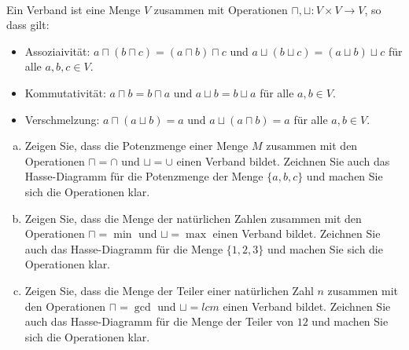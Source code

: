 \newcommand{\printpraesenzlsg}{false}
\newcommand{\printloesungen}{false}
\newcommand{\printbewertungen}{false}
\newcommand{\blattnummer}{2}



\iforiginal{}

	


\\
Ein Verband ist eine Menge $V$ zusammen mit Operationen $\sqcap, \sqcup:V\times V\to V$, so dass gilt:
\begin{itemize}
  \item Assoziaivität: $a \sqcap (b \sqcap c) = (a \sqcap b) \sqcap c$ und $a \sqcup (b \sqcup c) = (a \sqcup b) \sqcup c$ für alle $a,b,c \in V$.
  \item Kommutativität: $a \sqcap b = b \sqcap a$ und $a \sqcup b = b \sqcup a$ für alle $a,b \in V$.
  \item Verschmelzung: $a \sqcap (a \sqcup b) = a$ und $a \sqcup (a \sqcap b) = a$ für alle $a,b \in V$.
\end{itemize}
\begin{enumerate}[a)]
  \item Zeigen Sie, dass die Potenzmenge einer Menge $M$ zusammen mit den Operationen $\sqcap = \cap$ und $\sqcup = \cup$ einen Verband bildet. Zeichnen Sie auch das Hasse-Diagramm für die Potenzmenge der Menge $\{a,b,c\}$ und machen Sie sich die Operationen klar.
  \item Zeigen Sie, dass die Menge der natürlichen Zahlen zusammen mit den Operationen $\sqcap = \min$ und $\sqcup = \max$ einen Verband bildet. Zeichnen Sie auch das Hasse-Diagramm für die Menge $\{1,2,3\}$ und machen Sie sich die Operationen klar.
  \item Zeigen Sie, dass die Menge der Teiler einer natürlichen Zahl $n$ zusammen mit den Operationen $\sqcap = \gcd$ und $\sqcup = lcm$ einen Verband bildet. Zeichnen Sie auch das Hasse-Diagramm für die Menge der Teiler von $12$ und machen Sie sich die Operationen klar.
\end{enumerate}

